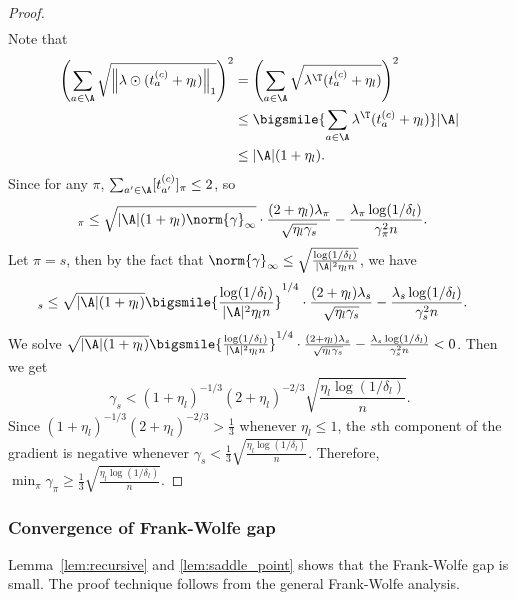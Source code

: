 \documentclass{article}
\newcommand{\1}{\mathbf{1}}
\begin{document}
\begin{proof}
\begin{align*}
\end{align*}
Note that 
\begin{align*}
    \left(\sum_{a \in \A} \sqrt{\left\|\lambda \odot (t_{a}^{(c)}+\eta_l)\right\|_{1}}\right)^2 &= \left(\sum_{a \in \A} \sqrt{\lambda^\T(t_a^{(c)}+\eta_l)}\right)^2\\
    &\leq \bigsmile{\sum_{a\in\A}\lambda^\T(t_a^{(c)}+\eta_l)}|\A|\\
    &\leq |\A|(1+\eta_l).
\end{align*}
Since for any $\pi$, $\sum_{a'\in\A}[t_{a'}^{(c)}]_\pi\leq 2$, so
\begin{align*}
    [\nabla_\gamma h_l(\lambda,\gamma)]_\pi&\leq \sqrt{|\A|(1+\eta_l)\norm{\gamma}_\infty}\cdot\frac{(2+\eta_l)\lambda_\pi}{\sqrt{\eta_l\gamma_s}}-\frac{\lambda_\pi\log(1/\delta_l)}{\gamma_\pi^2 n}.
\end{align*}
Let $\pi=s$, then by the fact that $\norm{\gamma}_\infty\leq \sqrt{\frac{\log(1/\delta_l)}{|\A|^2\eta_l n}}$, we have 
\begin{align*}
    [\nabla_\gamma h_l(\lambda,\gamma)]_s&\leq \sqrt{|\A|(1+\eta_l)}\bigsmile{\frac{\log(1/\delta_l)}{|\A|^2\eta_l n}}^{1/4}\cdot\frac{(2+\eta_l)\lambda_s}{\sqrt{\eta_l\gamma_s}}-\frac{\lambda_s\log(1/\delta_l)}{\gamma_s^2 n}.
\end{align*}
We solve $\sqrt{|\A|(1+\eta_l)}\bigsmile{\frac{\log(1/\delta_l)}{|\A|^2\eta_l n}}^{1/4}\cdot\frac{(2+\eta_l)\lambda_s}{\sqrt{\eta_l\gamma_s}}-\frac{\lambda_s\log(1/\delta_l)}{\gamma_s^2 n}<0$. Then we get $$\gamma_s<(1+\eta_l)^{-1/3}(2+\eta_l)^{-2/3}\sqrt{\frac{\eta_l\log(1/\delta_l)}{n}}.$$ 
Since $(1+\eta_l)^{-1/3}(2+\eta_l)^{-2/3}>\frac{1}{3}$ whenever $\eta_l\leq 1$, the $s$th component of the gradient is negative whenever $\gamma_s<\frac{1}{3}\sqrt{\frac{\eta_l\log(1/\delta_l)}{n}}$. Therefore, $\min_{\pi}\gamma_{\pi} \geq \frac{1}{3}\sqrt{\frac{\eta_l\log(1/\delta_l)}{n}}$. 
\end{proof}

\subsubsection{Convergence of Frank-Wolfe gap}
Lemma~\ref{lem:recursive} and \ref{lem:saddle_point} shows that the Frank-Wolfe gap is small. The proof technique follows from the general Frank-Wolfe analysis. 
\end{document}

